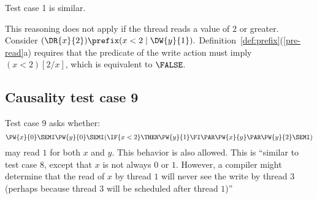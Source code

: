 Test case 1 is similar.
  
This reasoning does not apply if the thread reads a value of $2$ or greater.
Consider
\begin{math}
  (\DR{x}{2}) \prefix (x<2\mid\DW{y}{1}).
\end{math}
Definition~\ref{def:prefix}(\ref{pre-read}a) requires that the predicate
of the write action must imply $(x<2)[2/x]$, which is equivalent to $\FALSE$.


\begin{comment}
Consider the program variant:

x=0; r=x; if(r<2){y=1} || x=5

[[ y=1 ]] contains (Wy1)

[[ if(r<2){y=1} ]] contains (r<2|Wy1)

[[ r=x; if(r<2){y=1} ]] contains (Rx5)  (x<2|Wy1)  //with no order

[[ x=0; r=x; if(r<2){y=1} ]] contains (Wx0)  (Rx5)  (x<2|Wy1) //does not work, since violates (6a) 𝜆Φ′(𝑒) implies 𝜆Φ(𝑒)[𝑣/𝑥].
 

Another example:
So consider the single threaded program

x=4; x=5; r=x; if(r==4){y=1}

Clearly, this should not be able to give us Wy1.
Here is why that is not possible:

[[ y=1 ]] contains (Wy1)

[[ if(r==4){y=1} ]] contains (r==4|Wy1)

[[ r=x; if(r==4){y=1} ]] contains (Rx5)  (x==4|Wy1) // with no order

[[ x=5; r=x; if(r==4){y=1} ]] contains (Wx5)-->(Rx5)  (5==4|Wy1) // 5 is forced.
\end{comment}

  
\subsection{Causality test case 9}

Test case 9 asks whether:
\begin{displaymath}
   \PW{x}{0}\SEMI
   \PW{y}{0}\SEMI
  (\IF{x<2}\THEN \PW{y}{1}\FI 
  \PAR
  \PW{x}{y}
  \PAR
  \PW{y}{2}\SEMI)
\end{displaymath}
may read $1$ for both $x$ and $y$.  This behavior is also allowed.  This is
``similar to test case $8$, except that $x$ is not always $0$ or
$1$. However, a compiler might determine that the read of $x$ by thread $1$
will never see the write by thread $3$ (perhaps because thread $3$ will be
scheduled after thread $1$)''

